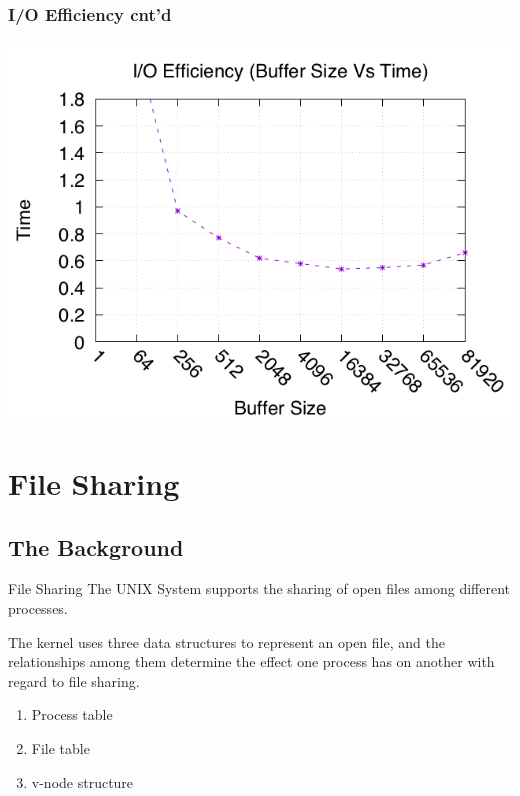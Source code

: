\documentclass[newPxFont,sthlmFooter,nooffset]{beamer}
\begin{document}
\begin{frame}[t]
  \frametitle{I/O Efficiency cnt'd}
\centering
\includegraphics[width=0.85\linewidth]{./figure/iotest2.png}
\end{frame}


\section{File Sharing}
\subsection{The Background}

\begin{frame}[t]{File Sharing}
The UNIX System supports the sharing of open files among different processes.

\bigskip
The kernel uses three data structures to represent an open file, and the relationships among them determine the effect one process has on another with regard to file sharing.

\bigskip
\begin{enumerate}
\item Process table
\item File table
\item v-node structure
\end{enumerate}

\end{frame}
\end{document}
